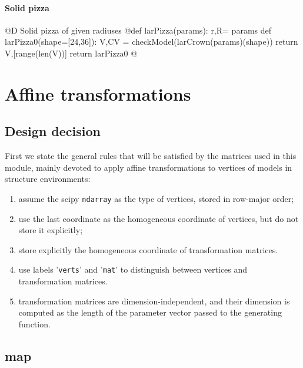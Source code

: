 \documentclass[11pt,oneside]{article}	%
\begin{document}
\paragraph{Solid pizza}
@D Solid pizza of given radiuses
@{def larPizza(params):
	r,R= params
	def larPizza0(shape=[24,36]):
		V,CV = checkModel(larCrown(params)(shape))
		return V,[range(len(V))]
	return larPizza0
@}
\section{Affine transformations}
\subsection{Design decision}
First we state the general rules that will be satisfied by the matrices used in this module, mainly devoted to apply affine transformations to vertices of models in structure environments:
\begin{enumerate}
\item assume the scipy \texttt{ndarray} as the type of vertices, stored in row-major order;
\item use the last coordinate as the homogeneous coordinate of vertices, but do not store it explicitly;
\item store explicitly the homogeneous coordinate of transformation matrices.
\item use labels '\texttt{verts}' and '\texttt{mat}' to distinguish between vertices and transformation matrices.
\item transformation matrices are dimension-independent, and their dimension is computed as the length of the parameter vector passed to the generating function.
\end{enumerate}


\subsection{map}
\end{document}
